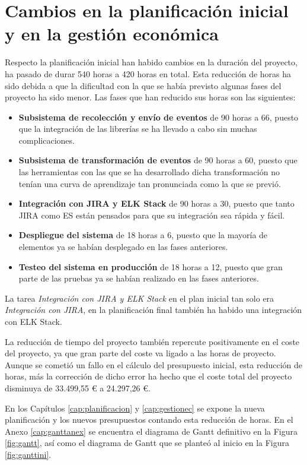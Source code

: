 \section{Cambios en la planificación inicial y en la gestión económica}

Respecto la planificación inicial han habido cambios en la duración del proyecto, ha pasado de durar 540 horas a 420 horas en total. Esta reducción de horas ha sido debida a que la dificultad con la que se había previsto algunas fases del proyecto ha sido menor. Las fases que han reducido sus horas son las siguientes:

\begin{itemize}
	\item \textbf{Subsistema de recolección y envío de eventos} de 90 horas a 66, puesto que la integración de las librerías se ha llevado a cabo sin muchas complicaciones.
	
	\item \textbf{Subsistema de transformación de eventos} de 90 horas a 60, puesto que las herramientas con las que se ha desarrollado dicha transformación no tenían una curva de aprendizaje tan pronunciada como la que se previó.
	
	\item \textbf{Integración con JIRA y ELK Stack} de 90 horas a 30, puesto que tanto JIRA como ES están pensados para que su integración sea rápida y fácil.
	
	\item \textbf{Despliegue del sistema} de 18 horas a 6, puesto que la mayoría de elementos ya se habían desplegado en las fases anteriores.
	
	\item \textbf{Testeo del sistema en producción} de 18 horas a 12, puesto que gran parte de las pruebas ya se habían realizado en las fases anteriores.
\end{itemize}

La tarea \textit{Integración con JIRA y ELK Stack} en el plan inicial tan solo era \textit{Integración con JIRA}, en la planificación final también ha habido una integración con ELK Stack.

La reducción de tiempo del proyecto también repercute positivamente en el coste del proyecto, ya que gran parte del coste va ligado a las horas de proyecto. Aunque se cometió un fallo en el cálculo del presupuesto inicial, esta reducción de horas, más la corrección de dicho error ha hecho que el coste total del proyecto disminuya de 33.499,55 € a 24.297,26 €.

En los Capítulos \ref{cap:planificacion} y \ref{cap:gestionec} se expone la nueva planificación y los nuevos presupuestos contando esta reducción de horas. En el Anexo \ref{cap:ganttanex} se encuentra el diagrama de Gantt definitivo en la Figura \ref{fig:gantt}, así como el diagrama de Gantt que se planteó al inicio en la Figura \ref{fig:ganttini}.

